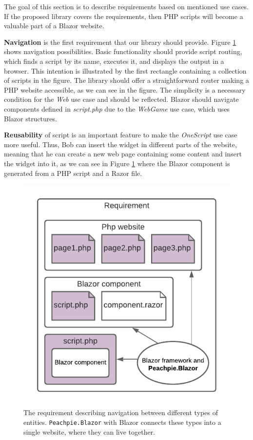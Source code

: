 The goal of this section is to describe requirements based on mentioned use cases.
If the proposed library covers the requirements, then PHP scripts will become a valuable part of a Blazor website.
\par
\textbf{Navigation} is the first requirement that our library should provide.
Figure \ref{img10:scripts} shows navigation possibilities.
Basic functionality should provide script routing, which finds a script by its name, executes it, and displays the output in a browser.
This intention is illustrated by the first rectangle containing a collection of scripts in the figure.
The library should offer a straightforward router making a PHP website accessible, as we can see in the figure.
The simplicity is a necessary condition for the \textit{Web} use case and should be reflected.
Blazor should navigate components defined in \textit{script.php} due to the \textit{WebGame} use case, which uses Blazor structures.
\par
\textbf{Reusability} of script is an important feature to make the \textit{OneScript} use case more useful.
Thus, Bob can insert the widget in different parts of the website, meaning that he can create a new web page containing some content and insert the widget into it, as we can see in Figure \ref{img10:scripts} where the Blazor component is generated from a PHP script and a Razor file.
\par
\begin{figure}
\centering
\includegraphics{./img/Requirement}
\caption{The requirement describing navigation between different types of entities. 
\texttt{Peachpie.Blazor} with Blazor connects these types into a single website, where they can live together.
}
\label{img10:scripts}
\end{figure} 

